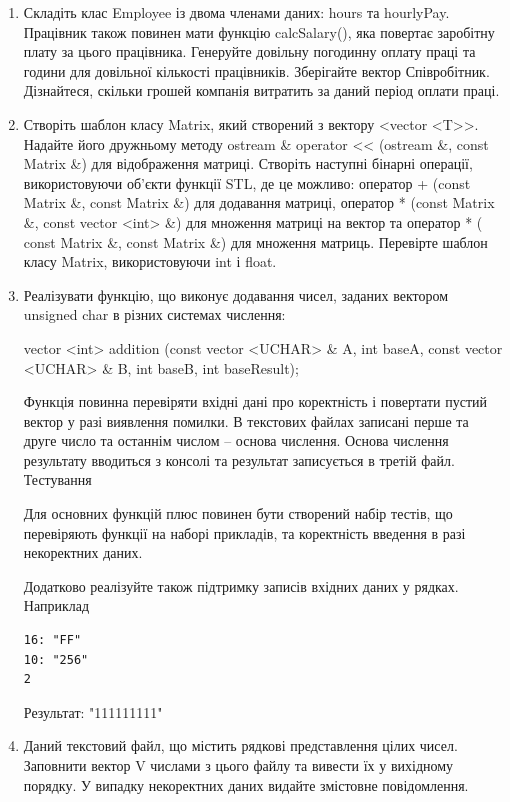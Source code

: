 \documentclass[a5paper,titlepage,openany,twoside,draft]{book_unv}%
\begin{document}
\begin{enumerate}
\item
  Складіть клас Employee із двома членами даних: hours та hourlyPay.
  Працівник також повинен мати функцію calcSalary(), яка повертає
  заробітну плату за цього працівника. Генеруйте довільну погодинну
  оплату праці та години для довільної кількості працівників. Зберігайте
  вектор Співробітник. Дізнайтеся, скільки
  грошей компанія витратить за даний період оплати праці.


\item
  Створіть шаблон класу Matrix, який створений з вектору
  \textless{}vector \textless{}T\textgreater{}\textgreater{}. Надайте
  його дружньому методу ostream \& operator \textless{}\textless{}
  (ostream \&, const Matrix \&) для відображення матриці. Створіть
  наступні бінарні операції, використовуючи об'єкти функції STL, де це
  можливо: оператор + (const Matrix \&, const Matrix \&) для додавання
  матриці, оператор * (const Matrix \&, const vector
  \textless{}int\textgreater{} \&) для множення матриці на вектор та
  оператор * ( const Matrix \&, const Matrix \&) для множення матриць.
  Перевірте шаблон класу Matrix, використовуючи int і float.

\item
Реалізувати функцію, що виконує додавання чисел, заданих вектором unsigned char
в різних системах числення: 

vector <int> addition (const vector <UCHAR> \& A, int baseA,
                      const vector <UCHAR> \& B, int baseB, int baseResult);

Функція повинна перевіряти вхідні дані про коректність і повертати пустий вектор у разі виявлення помилки.
В текстових файлах записані перше та друге число та останнім числом -- основа числення.
Основа числення результату вводиться з консолі та результат записується в третій файл.
Тестування

Для основних функцій плюс повинен бути створений набір тестів, що перевіряють функції на наборі прикладів, 
та коректність введення в разі некоректних даних. 

Додатково реалізуйте також підтримку записів вхідних даних у рядках. Наприклад
\begin{verbatim}
16: "FF"
10: "256"
2
\end{verbatim}
Результат:
"111111111" 

\item
Даний текстовий файл, що містить рядкові
представлення цілих чисел. Заповнити вектор V числами з цього файлу
та вивести їх у вихідному порядку. У випадку некоректних даних видайте
змістовне повідомлення.


\end{enumerate}
\end{document}
